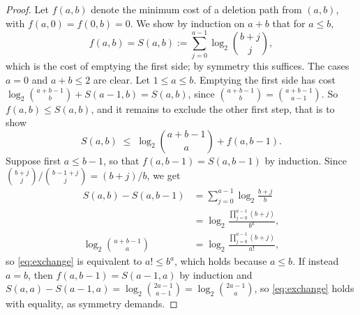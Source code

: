 \documentclass[10pt,a4paper]{amsart}
\newcommand{\bin}[2]{\binom{#1}{#2}}
\begin{document}
\begin{proof}
Let $f(a,b)$ denote the minimum cost of a deletion path from $(a,b)$, with $f(a,0)=f(0,b)=0$. We show by induction on $a+b$ that for $a\le b$,
\[
f(a,b)=S(a,b):=\sum_{j=0}^{a-1}\log_2\bin{b+j}{j},
\]
which is the cost of emptying the first side; by symmetry this suffices. The cases $a=0$ and $a+b\le2$ are clear. Let $1\le a\le b$. Emptying the first side has cost $\log_2\bin{a+b-1}{b}+S(a-1,b)=S(a,b)$, since $\bin{a+b-1}{b}=\bin{a+b-1}{a-1}$. So $f(a,b)\le S(a,b)$, and it remains to exclude the other first step, that is to show
\begin{equation}\label{eq:exchange}
S(a,b)\;\le\; \log_2\bin{a+b-1}{a}+f(a,b-1).
\end{equation}
Suppose first $a\le b-1$, so that $f(a,b-1)=S(a,b-1)$ by induction. Since
$\bin{b+j}{j}\big/\bin{b-1+j}{j}=(b+j)/b$, we get
\begin{align*}
S(a,b)-S(a,b-1)
&=\sum_{j=0}^{a-1}\log_2\frac{b+j}{b}\\
&=\log_2\frac{\prod_{j=0}^{a-1}(b+j)}{b^{a}},\\
\log_2\bin{a+b-1}{a}
&=\log_2\frac{\prod_{j=0}^{a-1}(b+j)}{a!},
\end{align*}
so \eqref{eq:exchange} is equivalent to $a!\le b^{a}$, which holds because $a\le b$. If instead $a=b$, then $f(a,b-1)=S(a-1,a)$ by induction and
$S(a,a)-S(a-1,a)=\log_2\bin{2a-1}{a-1}=\log_2\bin{2a-1}{a}$, so \eqref{eq:exchange} holds with equality, as symmetry demands.
\end{proof}
\end{document}
